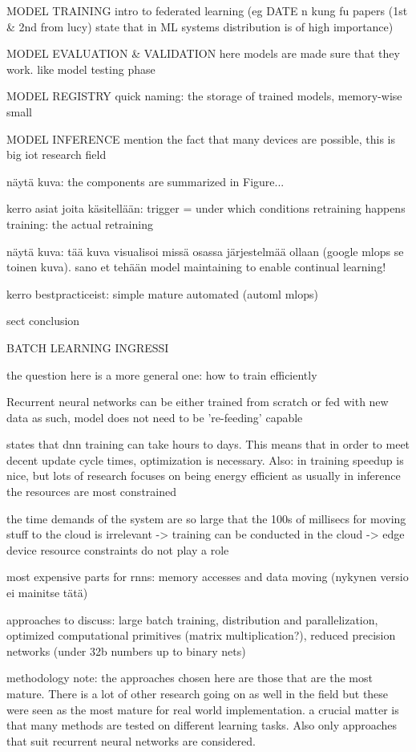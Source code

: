 	MODEL TRAINING
	intro to federated learning
	(eg DATE n kung fu papers (1st & 2nd from lucy) state that in ML systems distribution is of high importance)
	
	MODEL EVALUATION & VALIDATION
	here models are made sure that they work. like model testing phase

	MODEL REGISTRY
	quick naming: the storage of trained models, memory-wise small

	MODEL INFERENCE
	mention the fact that many devices are possible, this is big iot research field

näytä kuva: the components are summarized in Figure...

kerro asiat joita käsitellään: trigger = under which conditions retraining happens
training: the actual retraining

näytä kuva: tää kuva visualisoi missä osassa järjestelmää ollaan (google mlops se toinen kuva). sano et tehään model maintaining to enable continual learning!

kerro bestpracticeist: simple mature automated (automl mlops)

sect conclusion

BATCH LEARNING INGRESSI

the question here is a more general one: how to train efficiently

Recurrent neural networks can be either trained from scratch or fed with new data as such, model does not need to be 're-feeding' capable

 
states that dnn training can take hours to days. This means that in order to meet decent update cycle times, optimization is necessary. Also: in training speedup is nice, but lots of research focuses on being energy efficient as usually in inference the resources are most constrained

the time demands of the system are so large that the 100s of millisecs for moving stuff to the cloud is irrelevant -> training can be conducted in the cloud -> edge device resource constraints do not play a role

most expensive parts for rnns: memory accesses and data moving (nykynen versio ei mainitse tätä)

approaches to discuss: large batch training, distribution and parallelization, optimized computational primitives (matrix multiplication?), reduced precision networks (under 32b numbers up to binary nets)

methodology note: the approaches chosen here are those that are the most mature. There is a lot of other research going on as well in the field but these were seen as the most mature for real world implementation. a crucial matter is that many methods are tested on different learning tasks. Also only approaches that suit recurrent neural networks are considered.

